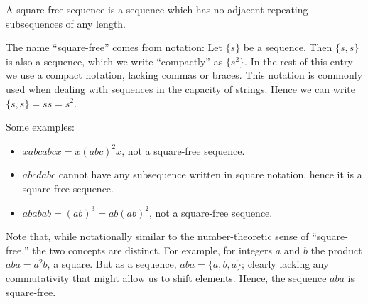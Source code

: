 \documentclass{article}
\begin{document}
A square-free sequence is a sequence which has no adjacent repeating subsequences of any length.  

The name ``square-free'' comes from notation: Let $\{s\}$ be a sequence.    Then $\{s,s\}$ is also a sequence, which we write ``compactly'' as $\{s^2\}$.  In the rest of this entry we use a compact notation, lacking commas or braces.  This notation is commonly used when dealing with sequences in the capacity of strings. Hence we can write $\{s,s\} = ss = s^2$.

Some examples:

\begin{itemize}
\item $xabcabcx = x(abc)^2x$, not a square-free sequence.
\item $abcdabc$ cannot have any subsequence written in square notation, hence it is a square-free sequence.
\item $ababab = (ab)^3 = ab(ab)^2$, not a square-free sequence.
\end{itemize}

Note that, while notationally similar to the number-theoretic sense of ``square-free,'' the two concepts are distinct.  For example, for integers $a$ and $b$ the product $aba = a^2b$, a square.   But as a sequence, $aba = \{a,b,a\}$; clearly lacking any commutativity that might allow us to shift elements.  Hence, the sequence $aba$ is square-free.
\end{document}
